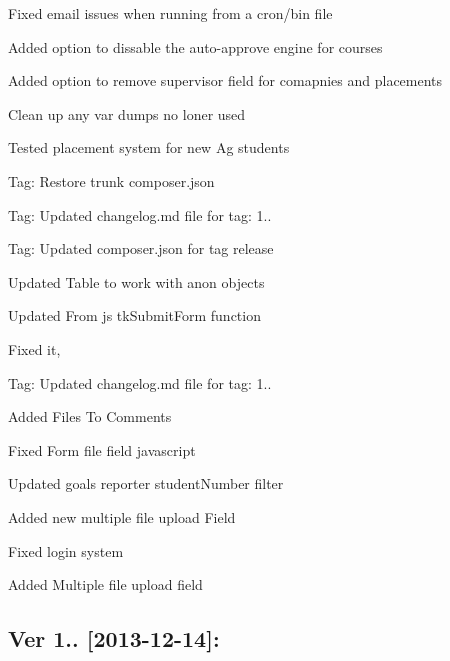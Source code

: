 \begin{DoxyItemize}
\item Fixed email issues when running from a cron/bin file
\item Added option to dissable the auto-\/approve engine for courses
\item Added option to remove supervisor field for comapnies and placements
\item Clean up any var dumps no loner used
\item Tested placement system for new Ag students
\item Tag\+: Restore trunk composer.\+json
\item Tag\+: Updated changelog.\+md file for tag\+: 1..
\item Tag\+: Updated composer.\+json for tag release
\item Updated Table to work with anon objects
\item Updated From js tk\+Submit\+Form function
\item Fixed it,
\item Tag\+: Updated changelog.\+md file for tag\+: 1..
\item Added Files To Comments
\item Fixed Form file field javascript
\item Updated goals reporter student\+Number filter
\item Added new multiple file upload Field
\item Fixed login system
\item Added Multiple file upload field
\end{DoxyItemize}

\subsection*{Ver 1.. \mbox{[}2013-\/12-\/14\mbox{]}\+: }


